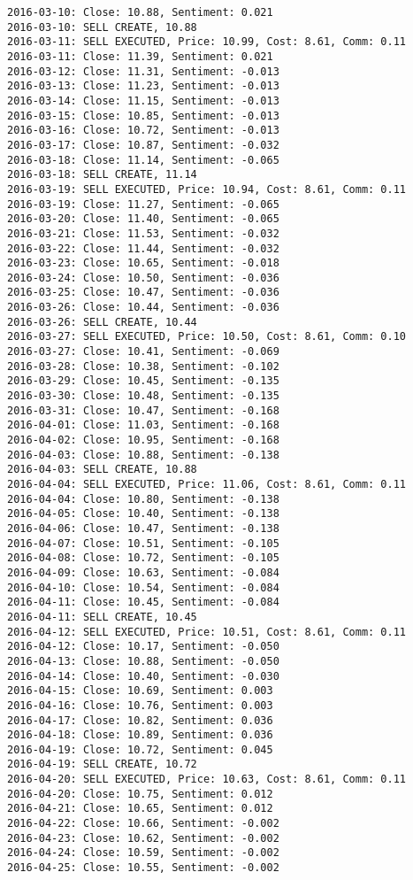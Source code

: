 \documentclass[11pt]{article}
\begin{document}
\begin{Verbatim}[commandchars=\\\{\}]
2016-03-10: Close: 10.88, Sentiment: 0.021
2016-03-10: SELL CREATE, 10.88
2016-03-11: SELL EXECUTED, Price: 10.99, Cost: 8.61, Comm: 0.11
2016-03-11: Close: 11.39, Sentiment: 0.021
2016-03-12: Close: 11.31, Sentiment: -0.013
2016-03-13: Close: 11.23, Sentiment: -0.013
2016-03-14: Close: 11.15, Sentiment: -0.013
2016-03-15: Close: 10.85, Sentiment: -0.013
2016-03-16: Close: 10.72, Sentiment: -0.013
2016-03-17: Close: 10.87, Sentiment: -0.032
2016-03-18: Close: 11.14, Sentiment: -0.065
2016-03-18: SELL CREATE, 11.14
2016-03-19: SELL EXECUTED, Price: 10.94, Cost: 8.61, Comm: 0.11
2016-03-19: Close: 11.27, Sentiment: -0.065
2016-03-20: Close: 11.40, Sentiment: -0.065
2016-03-21: Close: 11.53, Sentiment: -0.032
2016-03-22: Close: 11.44, Sentiment: -0.032
2016-03-23: Close: 10.65, Sentiment: -0.018
2016-03-24: Close: 10.50, Sentiment: -0.036
2016-03-25: Close: 10.47, Sentiment: -0.036
2016-03-26: Close: 10.44, Sentiment: -0.036
2016-03-26: SELL CREATE, 10.44
2016-03-27: SELL EXECUTED, Price: 10.50, Cost: 8.61, Comm: 0.10
2016-03-27: Close: 10.41, Sentiment: -0.069
2016-03-28: Close: 10.38, Sentiment: -0.102
2016-03-29: Close: 10.45, Sentiment: -0.135
2016-03-30: Close: 10.48, Sentiment: -0.135
2016-03-31: Close: 10.47, Sentiment: -0.168
2016-04-01: Close: 11.03, Sentiment: -0.168
2016-04-02: Close: 10.95, Sentiment: -0.168
2016-04-03: Close: 10.88, Sentiment: -0.138
2016-04-03: SELL CREATE, 10.88
2016-04-04: SELL EXECUTED, Price: 11.06, Cost: 8.61, Comm: 0.11
2016-04-04: Close: 10.80, Sentiment: -0.138
2016-04-05: Close: 10.40, Sentiment: -0.138
2016-04-06: Close: 10.47, Sentiment: -0.138
2016-04-07: Close: 10.51, Sentiment: -0.105
2016-04-08: Close: 10.72, Sentiment: -0.105
2016-04-09: Close: 10.63, Sentiment: -0.084
2016-04-10: Close: 10.54, Sentiment: -0.084
2016-04-11: Close: 10.45, Sentiment: -0.084
2016-04-11: SELL CREATE, 10.45
2016-04-12: SELL EXECUTED, Price: 10.51, Cost: 8.61, Comm: 0.11
2016-04-12: Close: 10.17, Sentiment: -0.050
2016-04-13: Close: 10.88, Sentiment: -0.050
2016-04-14: Close: 10.40, Sentiment: -0.030
2016-04-15: Close: 10.69, Sentiment: 0.003
2016-04-16: Close: 10.76, Sentiment: 0.003
2016-04-17: Close: 10.82, Sentiment: 0.036
2016-04-18: Close: 10.89, Sentiment: 0.036
2016-04-19: Close: 10.72, Sentiment: 0.045
2016-04-19: SELL CREATE, 10.72
2016-04-20: SELL EXECUTED, Price: 10.63, Cost: 8.61, Comm: 0.11
2016-04-20: Close: 10.75, Sentiment: 0.012
2016-04-21: Close: 10.65, Sentiment: 0.012
2016-04-22: Close: 10.66, Sentiment: -0.002
2016-04-23: Close: 10.62, Sentiment: -0.002
2016-04-24: Close: 10.59, Sentiment: -0.002
2016-04-25: Close: 10.55, Sentiment: -0.002

\end{Verbatim}
\end{document}
